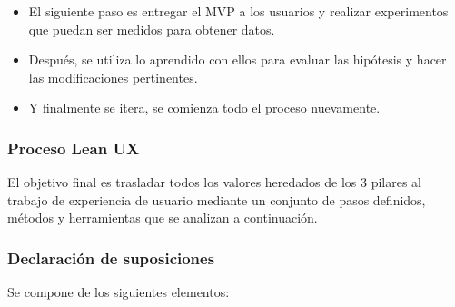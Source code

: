 \begin{enumerate}
\begin{itemize}
    \item El siguiente paso es entregar el MVP a los usuarios y realizar experimentos que puedan ser medidos para obtener datos.
    \item Después, se utiliza lo aprendido con ellos para evaluar las hipótesis y hacer las modificaciones pertinentes.
    \item Y finalmente se itera, se comienza todo el proceso nuevamente. 
    \end{itemize} 


\end{enumerate}

\clearpage
\subsubsection{Proceso Lean UX}
El objetivo final es trasladar todos los valores heredados de los 3 pilares al trabajo de experiencia de usuario mediante un conjunto de pasos definidos, métodos y herramientas que se analizan a continuación.


\subsubsection{Declaración de suposiciones}

Se compone de los siguientes elementos:


